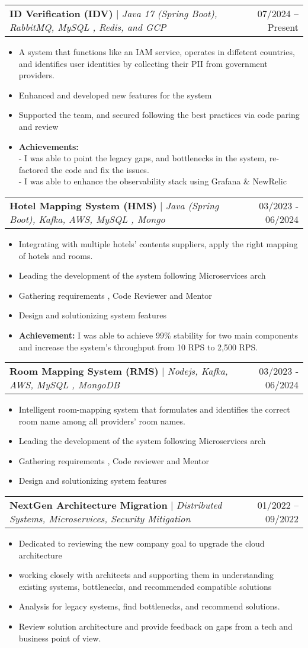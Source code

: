 \documentclass[letterpaper,11pt]{article}
\makeatletter
\newcommand{\resumeItem}[1]{
  \item\small{
    {#1 \vspace{-2pt}}
  }
}
\newcommand{\resumeProjectHeading}[2]{
    \item
    \begin{tabular*}{0.97\textwidth}{l@{\extracolsep{\fill}}r}
      \small#1 & #2 \\
    \end{tabular*}\vspace{-7pt}
}
\newcommand{\resumeItemListStart}{\begin{itemize}}
\newcommand{\resumeItemListEnd}{\end{itemize}\vspace{-5pt}}
\makeatother
\begin{document}
          
        \resumeProjectHeading
        {\textbf{ID Verification (IDV)} $|$ \footnotesize\emph{Java 17 (Spring Boot), RabbitMQ, MySQL , Redis, and GCP}}{07/2024 -- Present}
        \resumeItemListStart
            \resumeItem{A system that functions like an IAM service, operates in diffetent countries, and identifies user identities by collecting their PII from government providers.}
            \resumeItem{Enhanced and developed new features for the system}
            \resumeItem{Supported the team, and secured following the best practices via code paring and review}
            \resumeItem{
            	\textbf{Achievements:}\\
            	- I was able to point the legacy gaps, and bottlenecks in the system, re-factored the code and fix the issues. \\
            	- I was able to enhance the observability stack using Grafana \& NewRelic
            } 
          \resumeItemListEnd
    
        \resumeProjectHeading
        {\textbf{Hotel Mapping System (HMS)} $|$ \footnotesize\emph{Java (Spring Boot), Kafka, AWS, MySQL , Mongo}}{03/2023 - 06/2024}
        \resumeItemListStart
            \resumeItem{Integrating with multiple hotels' contents suppliers, apply the right mapping of hotels and rooms.}
            \resumeItem{Leading the development of the system following Microservices arch}
            \resumeItem{Gathering requirements , Code Reviewer and Mentor }
            \resumeItem{Design and solutionizing system features}
            \resumeItem{\textbf{Achievement:} I was able to achieve 99\% stability for two main components and increase the system's throughput from 10 RPS to 2,500 RPS. }
          \resumeItemListEnd
          
        \resumeProjectHeading
        {\textbf{Room Mapping System (RMS)} $|$ \footnotesize\emph{Nodejs, Kafka, AWS, MySQL , MongoDB}}{03/2023 - 06/2024}
        \resumeItemListStart
            \resumeItem{Intelligent room-mapping system that formulates and identifies the correct room name among all providers' room names.}
            \resumeItem{Leading the development of the system following Microservices arch}
            \resumeItem{Gathering requirements , Code reviewer and Mentor }
            \resumeItem{Design and solutionizing system features}
          \resumeItemListEnd
    
    	\newpage
        \resumeProjectHeading
        {\textbf{NextGen Architecture Migration} $|$ \footnotesize\emph{Distributed Systems, Microservices, Security Mitigation}}
        {01/2022 -- 09/2022}
        \resumeItemListStart
            \resumeItem{Dedicated to reviewing the new company goal to upgrade the cloud architecture}
            \resumeItem{working closely with architects and supporting them in understanding existing systems, bottlenecks, and recommended compatible solutions}
            \resumeItem{Analysis for legacy systems, find bottlenecks, and recommend solutions.}
            \resumeItem{Review solution architecture and provide feedback on gaps from a tech and business point of view. }
          \resumeItemListEnd
\end{document}

